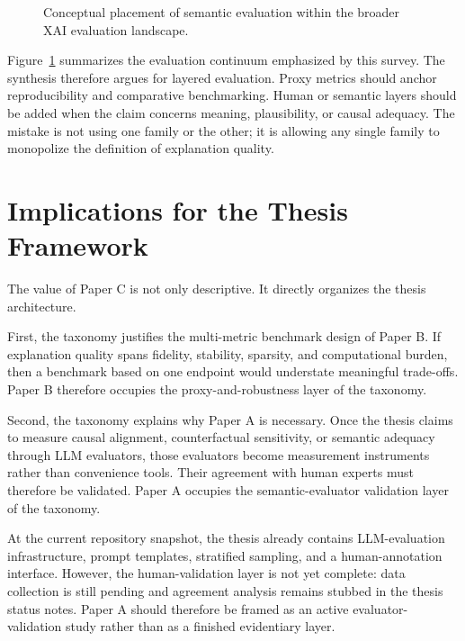 \documentclass[twoside,11pt]{article}
\begin{document}
\begin{figure}[t]
\centering
{}
\caption{Conceptual placement of semantic evaluation within the broader XAI evaluation landscape.}
\label{fig:continuum}
\end{figure}

Figure~\ref{fig:continuum} summarizes the evaluation continuum emphasized
by this survey. The synthesis therefore argues for layered evaluation.
Proxy metrics should anchor reproducibility and comparative benchmarking.
Human or semantic layers should be added when the claim concerns
meaning, plausibility, or causal adequacy. The mistake is not using one
family or the other; it is allowing any single family to monopolize the
definition of explanation quality.

\section{Implications for the Thesis Framework}

The value of Paper C is not only descriptive. It directly organizes the
thesis architecture.

First, the taxonomy justifies the multi-metric benchmark design of Paper
B. If explanation quality spans fidelity, stability, sparsity, and
computational burden, then a benchmark based on one endpoint would
understate meaningful trade-offs. Paper B therefore occupies the
proxy-and-robustness layer of the taxonomy.

Second, the taxonomy explains why Paper A is necessary. Once the thesis
claims to measure causal alignment, counterfactual sensitivity, or
semantic adequacy through LLM evaluators, those evaluators become
measurement instruments rather than convenience tools. Their agreement
with human experts must therefore be validated. Paper A occupies the
semantic-evaluator validation layer of the taxonomy.

At the current repository snapshot, the thesis already contains
LLM-evaluation infrastructure, prompt templates, stratified sampling,
and a human-annotation interface. However, the human-validation layer is
not yet complete: data collection is still pending and agreement
analysis remains stubbed in the thesis status notes. Paper A should
therefore be framed as an active evaluator-validation study rather than
as a finished evidentiary layer.
\end{document}
